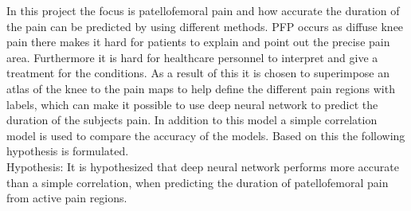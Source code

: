 In this project the focus is patellofemoral pain and how accurate the duration of the pain can be predicted by using different methods. PFP occurs as diffuse knee pain there makes it hard for patients to explain and point out the precise pain area. Furthermore it is hard for healthcare personnel to interpret and give a treatment for the conditions. As a result of this it is chosen to superimpose an atlas of the knee to the pain maps to help define the different pain regions with labels, which can make it possible to use deep neural network to predict the duration of the subjects pain. In addition to this model a simple correlation model is used to compare the accuracy of the models. Based on this the following hypothesis is formulated.\\

\noindent
Hypothesis: It is hypothesized that deep neural network performs more accurate than a simple correlation, when predicting the duration of patellofemoral pain from active pain regions.
